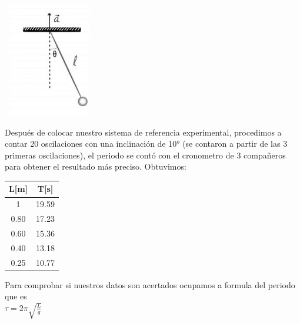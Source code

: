\documentclass[10pt]{article}
\begin{document}
\begin{multicols}{2}
\begin{center}
	\includegraphics[width=4cm,height=5cm]{Imagenes/pemdulo.png}
	\label{fig:pem}
\end{center}


Después de colocar nuestro sistema de referencia experimental, procedimos a contar 20 oscilaciones con una inclinación de 10° (se contaron a partir de las 3 primeras oscilaciones), el periodo se contó con el cronometro de 3 compañeros para obtener el resultado más preciso. 
Obtuvimos: 

\begin{center}
	\begin{adjustbox}{width=80pt}
		\begin{tabular}{|c|c|}
			\hline
			L[m] &T[s] \\
			\hline
			1	&19.59\\
			\hline
			0.80&	17.23\\
			\hline
			0.60 &	15.36\\
			\hline
			0.40&	13.18\\
			\hline
			0.25&	10.77\\
			\hline
		\end{tabular}
	\end{adjustbox}
\end{center}
Para comprobar si nuestros datos son acertados ocupamos a formula del periodo que es \\

$\tau = 2\pi \sqrt{\frac{L}{g}}$ \\


\end{multicols}
\end{document}
